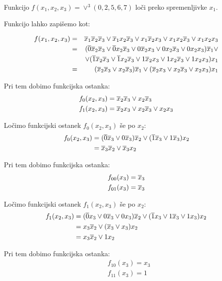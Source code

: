 \begin{zgled}
\label{zgled:ostanki}
Funkcijo $f(x_1, x_2, x_3) = \vee^3(0, 2, 5, 6, 7)$ loči preko spremenljivke $x_1$.
\end{zgled}
\begin{resitev}

Funkcijo lahko zapišemo kot:

\begin{align*}
	f(x_1, x_2, x_3)& = &\overline x_1 \overline x_2 \overline x_3 \vee \overline x_1 x_2 \overline x_3 \vee x_1 \overline x_2 x_3 \vee x_1 x_2 \overline x_3 \vee x_1 x_2 x_3\\
	 & = &(\overline 0 \overline x_2 \overline x_3 \vee \overline 0 x_2 \overline x_3 \vee 0 \overline x_2 x_3 \vee 0 x_2 \overline x_3 \vee 0 x_2 x_3) \overline x_1 \vee\\
	&    &\vee (\overline 1 \overline x_2 \overline x_3 \vee \overline 1 x_2 \overline x_3 \vee 1 \overline x_2 x_3 \vee 1 x_2 \overline x_3 \vee 1 x_2 x_3) x_1 \\
	& = &(\overline x_2 \overline x_3 \vee x_2 \overline x_3)\overline x_1 \vee (\overline x_2 x_3 \vee x_2 \overline x_3 \vee x_2 x_3) x_1
\end{align*}

\bigskip

Pri tem dobimo funkcijska ostanka:
\begin{align*}
&f_0(x_2,x_3)=\overline x_2 \overline x_3 \vee x_2 \overline x_3\\
&f_1(x_2,x_3)=\overline x_2 x_3 \vee x_2 \overline x_3 \vee x_2 x_3
\end{align*}

\bigskip

Ločimo funkcijski ostanek $f_0(x_2, x_3)$ še po $x_2$:
\begin{align*}
f_0(x_2,x_3)&=(\overline 0 \overline x_3 \vee 0 \overline x_3)\overline x_2 \vee (\overline 1 \overline x_3 \vee 1 \overline x_3) x_2\\
&=\overline x_3\overline x_2 \vee \overline x_3 x_2
\end{align*}

\bigskip

Pri tem dobimo funkcijska ostanka:
\begin{align*}
&f_{00}(x_3)=\overline x_3\\
&f_{01}(x_3)=\overline x_3
\end{align*}

\bigskip

Ločimo funkcijski ostanek $f_1(x_2, x_3)$ še po $x_2$:
\begin{align*}
f_1(x_2,x_3)&=(\overline 0 x_3 \vee 0 \overline x_3 \vee 0 x_3)\overline x_2 \vee (\overline 1 x_3 \vee 1 \overline x_3 \vee 1 x_3) x_2\\
&=x_3\overline x_2 \vee (\overline x_3 \vee x_3) x_2\\
&=x_3\overline x_2 \vee 1x_2
\end{align*}

\bigskip

Pri tem dobimo funkcijska ostanka:
\begin{align*}
&f_{10}(x_3)=x_3\\
&f_{11}(x_3)=1
\end{align*}

\end{resitev}

